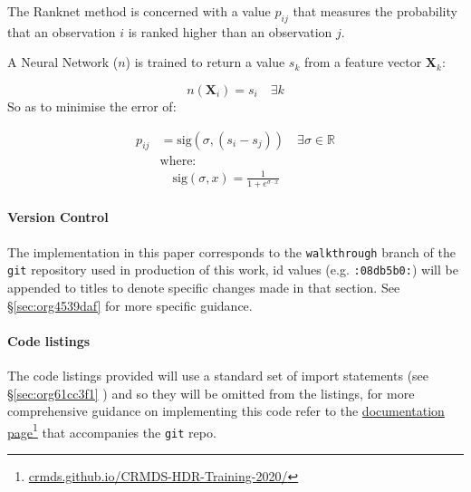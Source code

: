 \documentclass[a4paper,11pt,twoside]{article}
\begin{document}
The Ranknet method is concerned with a value \(p_{ij}\) that
measures the probability that an observation \(i\) is ranked higher
than an observation \(j\).

A Neural Network (\(n\)) is trained to return a value
\(s_k\) from a feature vector \(\mathbf{X}_k\):

 \[n(\mathbf{X}_i) = s_i \quad \exists k\]
So as to minimise the error of:




\begin{align} 
 p_{ij} &= \mathrm{sig}\left(\sigma, (s_i-s_j) \right) \quad \exists \sigma \in \mathbb{R} \\
 &\text{where:} \nonumber \\
 &\quad  \mathrm{sig}\left(\sigma, x\right) = \frac{1}{1+e^{\sigma \cdot x}} 
\end{align} 



\paragraph{Version Control}
\label{sec:org8277ba4}
The implementation in this paper corresponds to the \texttt{walkthrough} branch
of the \texttt{git} repository used in production of this work, id values
(e.g. \texttt{:08db5b0:}) will be appended to titles to denote specific
changes made in that section. See \S \ref{sec:org4539daf} for
more specific guidance.

\paragraph{Code listings}
\label{sec:orgdf3b7ea}
The code listings provided will use a standard set of import
statements (see \S \ref{sec:org61cc3f1} ) and so they will be
omitted from the listings, for more comprehensive guidance on
implementing this code refer to the \href{https://crmds.github.io/CRMDS-HDR-Training-2020/}{documentation page}\footnote{\href{https://crmds.github.io/CRMDS-HDR-Training-2020/}{crmds.github.io/CRMDS-HDR-Training-2020/}} that
accompanies the \texttt{git} repo.
\end{document}
